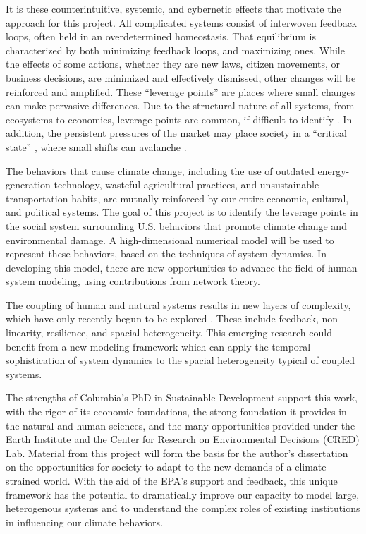\documentclass[12pt, oneside]{amsart}
\begin{document}
It is these counterintuitive, systemic, and cybernetic effects that motivate the approach for this project.  All complicated systems consist of interwoven feedback loops, often held in an overdetermined homeostasis.  That equilibrium is characterized by both minimizing feedback loops, and maximizing ones.  While the effects of some actions, whether they are new laws, citizen movements, or business decisions, are minimized and effectively dismissed, other changes will be reinforced and amplified.  These ``leverage points'' are places where small changes can make pervasive differences.  Due to the structural nature of all systems, from ecosystems to economies, leverage points are common, if difficult to identify \citep{meadows1997places}.  In addition, the persistent pressures of the market may place society in a ``critical state'' \citep{lux1998scaling}, where small shifts can avalanche \citep{frette1996avalanche}.

The behaviors that cause climate change, including the use of outdated energy-generation technology, wasteful agricultural practices, and unsustainable transportation habits, are mutually reinforced by our entire economic, cultural, and political systems.  The goal of this project is to identify the leverage points in the social system surrounding U.S. behaviors that promote climate change and environmental damage.  A high-dimensional numerical model will be used to represent these behaviors, based on the techniques of system dynamics.  In developing this model, there are new opportunities to advance the field of human system modeling, using contributions from network theory.

The coupling of human and natural systems results in new layers of complexity, which have only recently begun to be explored \citep{liu2007complexity}.  These include feedback, non-linearity, resilience, and spacial heterogeneity.  This emerging research could benefit from a new modeling framework which can apply the temporal sophistication of system dynamics to the spacial heterogeneity typical of coupled systems.

The strengths of Columbia's PhD in Sustainable Development support this work, with the rigor of its economic foundations, the strong foundation it provides in the natural and human sciences, and the many opportunities provided under the Earth Institute and the Center for Research on Environmental Decisions (CRED) Lab.  Material from this project will form the basis for the author's dissertation on the opportunities for society to adapt to the new demands of a climate-strained world.  With the aid of the EPA's support and feedback, this unique framework has the potential to dramatically improve our capacity to model large, heterogenous systems and to understand the complex roles of existing institutions in influencing our climate behaviors.
\end{document}
